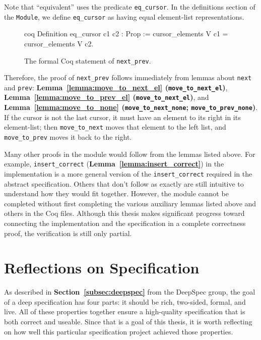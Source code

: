 \documentclass[12pt]{article}
\begin{document}
Note that ``equivalent'' uses the predicate \texttt{eq\_cursor}. In the definitions section of the \texttt{Module}, we define \texttt{eq\_cursor} as having equal element-list representations.

\begin{singlespace}
\begin{figure}[ht]
\centering
\begin{cminted}{coq}
Definition eq_cursor c1 c2 : Prop :=
  cursor_elements V c1 = cursor_elements V c2.
\end{cminted}
\caption{The formal Coq statement of \texttt{next\_prev}.}
\end{figure}
\end{singlespace}

Therefore, the proof of \texttt{next\_prev} follows immediately from lemmas about \texttt{next} and \texttt{prev}: \textbf{Lemma~\ref{lemma:move_to_next_el} (\texttt{move\_to\_next\_el})}, \textbf{Lemma~\ref{lemma:move_to_prev_el} (\texttt{move\_to\_next\_el})}, and \textbf{Lemma~\ref{lemma:move_to_none} (\texttt{move\_to\_next\_none}; \texttt{move\_to\_prev\_none})}. If the cursor is not the last cursor, it must have an element to its right in its element-list; then \texttt{move\_to\_next} moves that element to the left list, and \texttt{move\_to\_prev} moves it back to the right.

Many other proofs in the module would follow from the lemmas listed above. For example, \texttt{insert\_correct} (\textbf{Lemma~\ref{lemma:insert_correct}}) in the implementation is a more general version of the \texttt{insert\_correct} required in the abstract specification. Others that don't follow as exactly are still intuitive to understand how they would fit together. However, the module cannot be completed without first completing the various auxiliary lemmas listed above and others in the Coq files. Although this thesis makes significant progress toward connecting the implementation and the specification in a complete correctness proof, the verification is still only partial.

\clearpage

\section{Reflections on Specification}

As described in \textbf{Section~\ref{subsec:deepspec}} from the DeepSpec group, the goal of a deep specification has four parts: it should be rich, two-sided, formal, and live. All of these properties together ensure a high-quality specification that is both correct and useable. Since that is a goal of this thesis, it is worth reflecting on how well this particular specification project achieved those properties.
\end{document}
